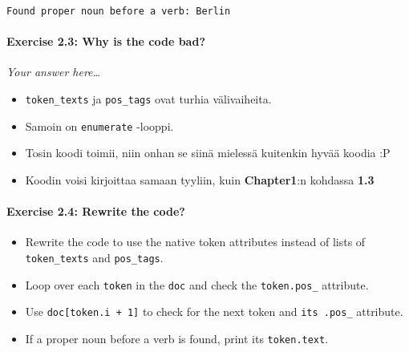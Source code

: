 \documentclass[11pt]{article}
\providecommand{\tightlist}{%
      \setlength{\itemsep}{0pt}\setlength{\parskip}{0pt}}
\begin{document}
    \begin{Verbatim}[commandchars=\\\{\}]
Found proper noun before a verb: Berlin

    \end{Verbatim}

    \hypertarget{exercise-2.3-why-is-the-code-bad}{%
\paragraph{Exercise 2.3: Why is the code
bad?}\label{exercise-2.3-why-is-the-code-bad}}

    \emph{Your answer here\ldots{}}

    \begin{itemize}
\item
  \texttt{token\_texts} ja \texttt{pos\_tags} ovat turhia välivaiheita.
\item
  Samoin on \texttt{enumerate} -looppi.
\item
  Tosin koodi toimii, niin onhan se siinä mielessä kuitenkin hyvää
  koodia :P
\item
  Koodin voisi kirjoittaa samaan tyyliin, kuin \textbf{Chapter1}:n
  kohdassa \textbf{1.3}
\end{itemize}

    \hypertarget{exercise-2.4-rewrite-the-code}{%
\paragraph{Exercise 2.4: Rewrite the
code?}\label{exercise-2.4-rewrite-the-code}}

\begin{itemize}
\tightlist
\item
  Rewrite the code to use the native token attributes instead of lists
  of \texttt{token\_texts} and \texttt{pos\_tags}.
\item
  Loop over each \texttt{token} in the \texttt{doc} and check the
  \texttt{token.pos\_} attribute.
\item
  Use \texttt{doc{[}token.i\ +\ 1{]}} to check for the next token and
  \texttt{its\ .pos\_} attribute.
\item
  If a proper noun before a verb is found, print its
  \texttt{token.text}.
\end{itemize}
\end{document}
